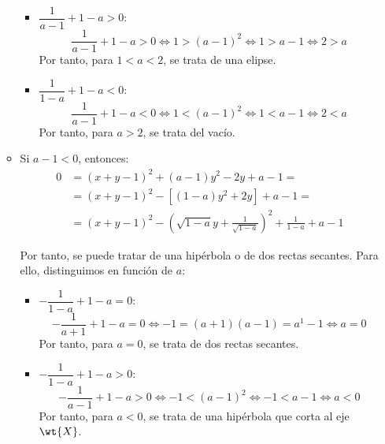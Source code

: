 \begin{ejercicio}
\begin{enumerate}
\begin{itemize}
\begin{itemize}
                \item $\dfrac{1}{a-1} + 1-a > 0$:
                \begin{equation*}
                    \frac{1}{a-1} + 1-a > 0 \Longleftrightarrow 1 > (a-1)^2 \Longleftrightarrow 1>a-1 \Longleftrightarrow 2>a
                \end{equation*}
                Por tanto, para $1<a<2$, se trata de una elipse.

                \item $\dfrac{1}{1-a} + 1-a < 0$:
                \begin{equation*}
                    \frac{1}{a-1} + 1-a < 0 \Longleftrightarrow 1 < (a-1)^2 \Longleftrightarrow 1<a-1 \Longleftrightarrow 2<a
                \end{equation*}
                Por tanto, para $a>2$, se trata del vacío.
            \end{itemize}

            \item Si $a-1 < 0$, entonces:
            \begin{equation*}
                \begin{split}
                    0 &= (x+y-1)^2 + (a-1)y^2 -2y + a-1 = \\
                    &= (x+y-1)^2 - \left[(1-a)y^2 +2y\right] + a-1 = \\
                    &= (x+y-1)^2 - \left(\sqrt{1-a}y + \frac{1}{\sqrt{1-a}}\right)^2 + \frac{1}{1-a} + a-1
                \end{split}
            \end{equation*}

            Por tanto, se puede tratar de una hipérbola o de dos rectas secantes. Para ello, distinguimos en función de $a$:
            \begin{itemize}
                \item $-\dfrac{1}{1-a} + 1-a = 0$:
                \begin{equation*}
                    -\frac{1}{a+1} + 1-a = 0 \Longleftrightarrow -1 = (a+1)(a-1) = a^1 -1 \Longleftrightarrow a = 0
                \end{equation*}
                Por tanto, para $a=0$, se trata de dos rectas secantes.

                \item $-\dfrac{1}{1-a} + 1-a > 0$:
                \begin{equation*}
                    -\frac{1}{a-1} + 1-a > 0 \Longleftrightarrow -1 < (a-1)^2 \Longleftrightarrow -1<a-1 \Longleftrightarrow a<0
                \end{equation*}
                Por tanto, para $a<0$, se trata de una hipérbola que corta al eje $\wt{X}$.


\end{itemize}
\end{itemize}
\end{enumerate}
\end{ejercicio}
